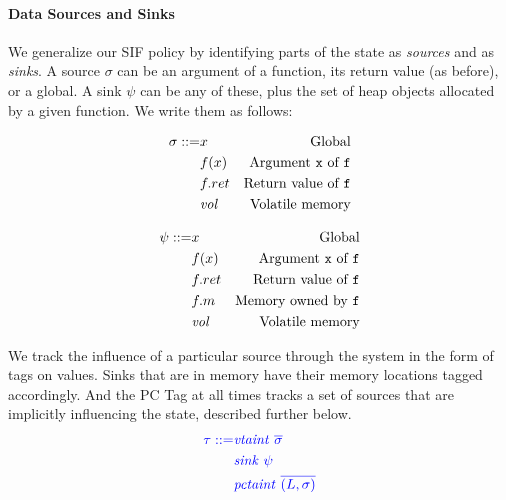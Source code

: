 \documentclass[acmsmall,review,anonymous]{acmart}\settopmatter{printfolios=true,printccs=false,printacmref=false}
\begin{document}
\paragraph*{Data Sources and Sinks}

We generalize our SIF policy by identifying parts of the state as
{\em sources} and as {\em sinks}.
A source \(\sigma\) can be an argument of a function, its return value (as before), or a global.
A sink \(\psi\) can be any of these, plus the set of heap objects allocated by a given function.
We write them as follows:

\begin{minipage}{0.5\textwidth}
  \[\begin{aligned}
  \sigma ::= & x & \textnormal{Global} \\
  & f(x) & \textnormal{Argument {\tt x} of {\tt f}} \\
  & f.ret & \textnormal{Return value of {\tt f}} \\
  & \mathit{vol} & \textnormal{Volatile memory} \\
  \end{aligned}\]
\end{minipage}
\begin{minipage}{0.5\textwidth}
  \[\begin{aligned}
  \psi ::= & x & \textnormal{Global} \\
  & f(x) & \textnormal{Argument {\tt x} of {\tt f}} \\
  & f.ret & \textnormal{Return value of {\tt f}} \\
  & f.m & \textnormal{Memory owned by {\tt f}} \\
  & \mathit{vol} & \textnormal{Volatile memory} \\
  \end{aligned}\]
\end{minipage}

We track the influence of a particular source through the system in the form
of tags on values. Sinks that are in memory have their memory locations tagged accordingly. And
the PC Tag at all times tracks a set of sources that are implicitly influencing the state, described
further below.
%
\[  \color{blue}
\begin{aligned}
  \tau ::= & \mathit{\color{blue} vtaint ~ \overline{\sigma}} \\
  & \mathit{sink} ~ \psi \\
  & \mathit{pctaint} ~ \overline{(L,\sigma)} \\
\end{aligned}\]
%
\end{document}
